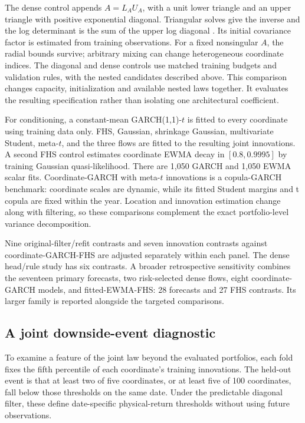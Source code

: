 \documentclass[11pt]{article}
\theoremstyle{definition}\newtheorem{definition}[theorem]{Definition}
\theoremstyle{remark}\newtheorem{remark}[theorem]{Remark}
\begin{document}
The dense control appends $A=L_AU_A$, with a unit lower triangle and an upper triangle with positive exponential diagonal. Triangular solves give the inverse and the log determinant is the sum of the upper log diagonal \citep{kingma2018glow}. Its initial covariance factor is estimated from training observations. For a fixed nonsingular $A$, the radial bounds survive; arbitrary mixing can change heterogeneous coordinate indices. The diagonal and dense controls use matched training budgets and validation rules, with the nested candidates described above. This comparison changes capacity, initialization and available nested laws together. It evaluates the resulting specification rather than isolating one architectural coefficient.

For conditioning, a constant-mean GARCH(1,1)-$t$ is fitted to every coordinate using training data only. FHS, Gaussian, shrinkage Gaussian, multivariate Student, meta-$t$, and the three flows are fitted to the resulting joint innovations. A second FHS control estimates coordinate EWMA decay in $[0.8,0.9995]$ by training Gaussian quasi-likelihood. There are 1,050 GARCH and 1,050 EWMA scalar fits. Coordinate-GARCH with meta-$t$ innovations is a copula-GARCH benchmark: coordinate scales are dynamic, while its fitted Student margins and t copula are fixed within the year. Location and innovation estimation change along with filtering, so these comparisons complement the exact portfolio-level variance decomposition.

Nine original-filter/refit contrasts and seven innovation contrasts against coordinate-GARCH-FHS are adjusted separately within each panel. The dense head/rule study has six contrasts. A broader retrospective sensitivity combines the seventeen primary forecasts, two risk-selected dense flows, eight coordinate-GARCH models, and fitted-EWMA-FHS: 28 forecasts and 27 FHS contrasts. Its larger family is reported alongside the targeted comparisons.

\subsection{A joint downside-event diagnostic}\label{sec:joint-event}
To examine a feature of the joint law beyond the evaluated portfolios, each fold fixes the fifth percentile of each coordinate's training innovations. The held-out event is that at least two of five coordinates, or at least five of 100 coordinates, fall below those thresholds on the same date. Under the predictable diagonal filter, these define date-specific physical-return thresholds without using future observations.
\end{document}
